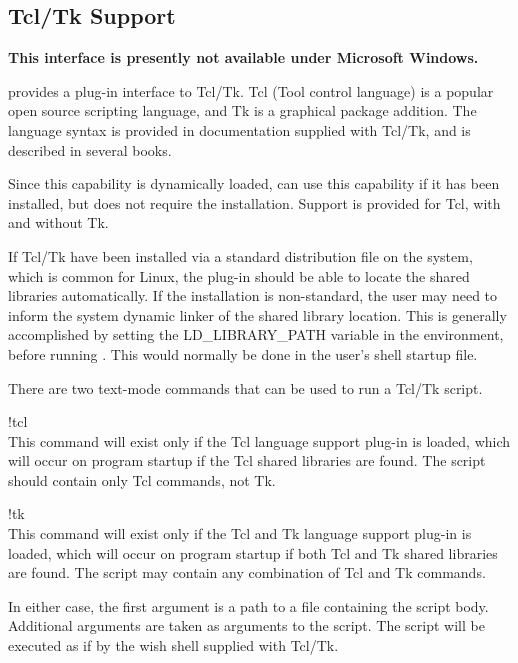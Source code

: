 \begin{itemize}
\section{Tcl/Tk Support}
\label{tcltk}

{\bf This interface is presently not available under Microsoft Windows.}

{\Xic} provides a plug-in interface to Tcl/Tk.  Tcl (Tool control
language) is a popular open source scripting language, and Tk is a
graphical package addition.  The language syntax is provided in
documentation supplied with Tcl/Tk, and is described in several books.

Since this capability is dynamically loaded, {\Xic} can use this
capability if it has been installed, but does not require the
installation.  Support is provided for Tcl, with and without Tk.

If Tcl/Tk have been installed via a standard distribution file on the
system, which is common for Linux, the plug-in should be able to
locate the shared libraries automatically.  If the installation is
non-standard, the user may need to inform the system dynamic linker of
the shared library location.  This is generally accomplished by
setting the {\et LD\_LIBRARY\_PATH} variable in the environment,
before running {\Xic}.  This would normally be done in the user's
shell startup file.

There are two text-mode commands that can be used to run a Tcl/Tk
script.

\begin{description}
\item{\cb !tcl}\\
This command will exist only if the Tcl language support plug-in is
loaded, which will occur on program startup if the Tcl shared
libraries are found.  The script should contain only Tcl commands, not
Tk.

\item{\cb !tk}\\
This command will exist only if the Tcl and Tk language support
plug-in is loaded, which will occur on program startup if both Tcl and
Tk shared libraries are found.  The script may contain any combination
of Tcl and Tk commands.
\end{description}

In either case, the first argument is a path to a file containing the
script body.  Additional arguments are taken as arguments to the
script.  The script will be executed as if by the {\et wish} shell
supplied with Tcl/Tk.


\end{itemize}
